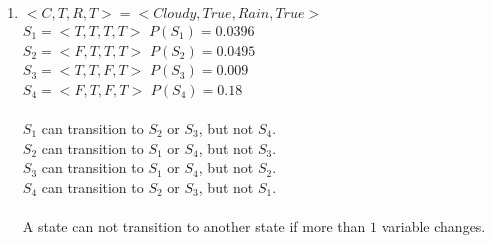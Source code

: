 \documentclass[12pt,a4paper]{report}
\begin{document}
\begin{enumerate}
\begin{enumerate}
	\item
	$<C,T,R,T> = <Cloudy, True, Rain, True>$\\ 
	$S_1 = <T,T,T,T>$ $P(S_1) = 0.0396$\\
	$S_2 = <F,T,T,T>$ $P(S_2) = 0.0495$\\
	$S_3 = <T,T,F,T>$ $P(S_3) = 0.009$\\
	$S_4 = <F,T,F,T>$ $P(S_4) = 0.18$\\
	\\$S_1$ can transition to $S_2$ or $S_3$, but not $S_4$.\\
	$S_2$ can transition to $S_1$ or $S_4$, but not $S_3$.\\
	$S_3$ can transition to $S_1$ or $S_4$, but not $S_2$.\\
	$S_4$ can transition to $S_2$ or $S_3$, but not $S_1$.\\
	\\A state can not transition to another state if more than $1$ variable changes.\\
	

\end{enumerate}
\end{enumerate}
\end{document}
